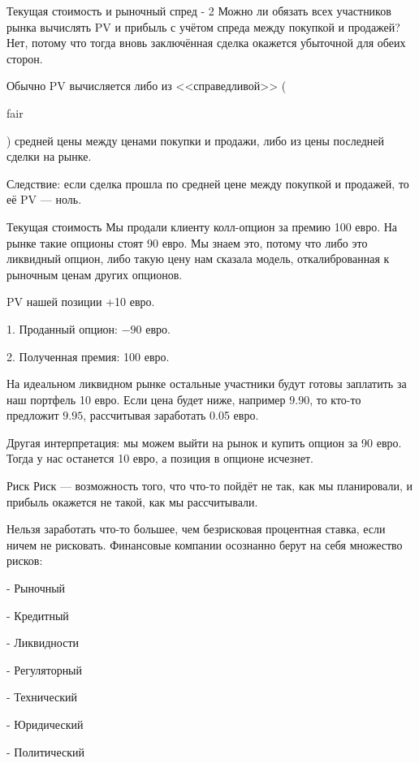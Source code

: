 \documentclass{beamer}
\newcommand{\en}[1]{\begin{otherlanguage}{english}#1\end{otherlanguage}}
\begin{document}
\begin{frame}{Текущая стоимость и рыночный спред - 2}
\justify
Можно ли обязать всех участников рынка вычислять PV и прибыль с учётом спреда между покупкой и продажей? Нет, потому что тогда вновь заключённая сделка окажется убыточной для обеих сторон.

\justify
Обычно PV вычисляется либо из <<справедливой>> (\en{fair}) средней цены между ценами покупки и продажи, либо из цены последней сделки на рынке. 

\justify
Следствие: если сделка прошла по средней цене между покупкой и продажей, то её PV --- ноль.
\end{frame}



\begin{frame}{Текущая стоимость}
\justify
Мы продали клиенту колл-опцион за премию 100 евро. На рынке такие опционы стоят 90 евро.  
Мы знаем это, потому что либо это ликвидный опцион, либо такую цену нам сказала модель, 
откалиброванная к рыночным ценам других опционов.

\justify
PV нашей позиции +10 евро.

1. Проданный опцион: $-90$ евро.

2. Полученная премия: 100 евро.

\justify
На идеальном ликвидном рынке остальные участники будут готовы заплатить за наш портфель 
10 евро. Если цена будет ниже, например $9.90$, то кто-то предложит $9.95$, рассчитывая 
заработать 0.05 евро.

\justify
Другая интерпретация: мы можем выйти на рынок и купить опцион за 90 евро. Тогда у нас 
останется 10 евро, а позиция в опционе исчезнет. 
\end{frame}



\begin{frame}{Риск}
\justify
\alert{Риск} --- возможность того, что что-то пойдёт не так, как мы планировали, и 	прибыль окажется не такой, как мы рассчитывали.

\justify
Нельзя заработать что-то большее, чем безрисковая процентная ставка, если ничем не рисковать. Финансовые компании осознанно берут на себя множество рисков:

- Рыночный

- Кредитный

- Ликвидности

- Регуляторный

- Технический

- Юридический

- Политический
\end{frame}
\end{document}
